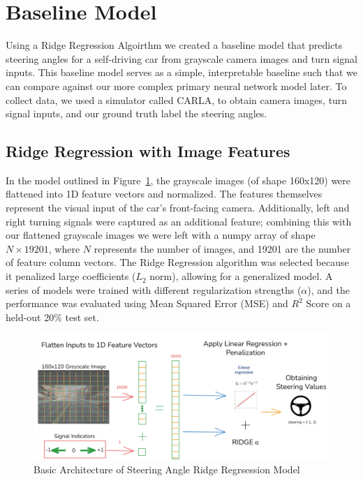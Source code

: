 \documentclass{article} %
\begin{document}
\section{Baseline Model}

Using a Ridge Regression Algoirthm we created a baseline model that predicts steering angles for a self-driving car 
from grayscale camera images and turn signal inputs. This baseline model serves as a simple, interpretable baseline
such that we can compare against our more complex primary neural network model later. To collect data, we used a simulator
called CARLA, to obtain camera images, turn signal inputs, and our ground truth label the steering angles.


\subsection{Ridge Regression with Image Features}

In the model outlined in Figure~\ref{fig:diagram}, the grayscale images (of shape 160x120) were flattened into 1D feature vectors and normalized. The features themselves
represent the visual input of the car's front-facing camera. Additionally, left and right turning signals were captured as an
additional feature; combining this with our flattened grayscale images we were left with a numpy array of shape $N \times 19201$,
where $N$ represents the number of images, and 19201 are the number of feature column vectors. The Ridge Regression algorithm was
selected because it penalized large coefficients ($L_2$ norm), allowing for a generalized model. A series of models were trained
with different regularization strengths ($\alpha$), and the performance was evaluated using Mean Squared Error (MSE) and $R^2$ Score
on a held-out 20\% test set. 

\begin{figure}[H] %
    \centering
    \includegraphics[width=1.0\textwidth]{diagram.png} %
    \caption{Basic Architecture of Steering Angle Ridge Regrsession Model}
    \label{fig:diagram}
\end{figure}
\end{document}
